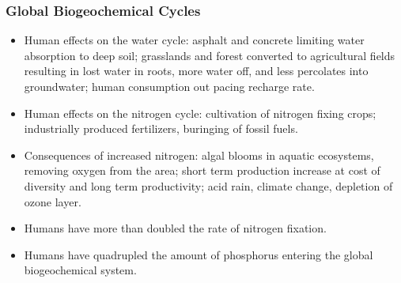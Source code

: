 \documentclass[12pt,a4paper]{article}
\begin{document}
\subsubsection{Global Biogeochemical Cycles}
\begin{itemize}
    \item Human effects on the water cycle: asphalt and concrete limiting water absorption to deep soil; grasslands and forest converted to agricultural fields resulting in lost water in roots, more water off, and less percolates into groundwater; human consumption out pacing recharge rate.
    \item Human effects on the nitrogen cycle: cultivation of nitrogen fixing crops; industrially produced fertilizers, buringing of fossil fuels.
    \item Consequences of increased nitrogen: algal blooms in aquatic ecosystems, removing oxygen from the area; short term production increase at cost of diversity and long term productivity; acid rain, climate change, depletion of ozone layer.
    \item Humans have more than doubled the rate of nitrogen fixation.
    \item Humans have quadrupled the amount of phosphorus entering the global biogeochemical system. 
\end{itemize}
\end{document}
